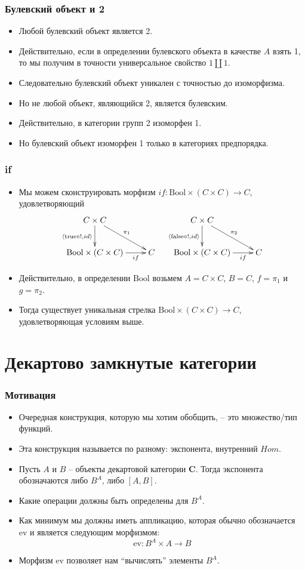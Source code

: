 \documentclass{beamer}
\theoremstyle{definition}
\newcommand{\cat}[1]{\mathbf{#1}}
\renewcommand{\C}{\cat{C}}
\newcommand{\bool}{\mathrm{Bool}}
\newcommand{\true}{\mathrm{true}}
\newcommand{\false}{\mathrm{false}}
\newcommand{\ev}{\mathrm{ev}}
\begin{document}
\begin{frame}
\frametitle{Булевский объект и 2}
\begin{itemize}
\item Любой булевский объект является 2.
\item Действительно, если в определении булевского объекта в качестве $A$ взять 1, то мы получим в точности универсальное свойство $1 \amalg 1$.
\item Следовательно булевский объект уникален с точностью до изоморфизма.
\item Но не любой объект, являющийся 2, является булевским.
\item Действительно, в категории групп 2 изоморфен 1.
\item Но булевский объект изоморфен 1 только в категориях предпорядка.
\end{itemize}
\end{frame}

\begin{frame}
\frametitle{if}
\begin{itemize}
\item Мы можем сконструировать морфизм $if : \bool \times (C \times C) \to C$, удовлетворяющий
\[ \xymatrix{ C \times C \ar[d]_{\langle \true \circ !, id \rangle} \ar[rd]^{\pi_1} \\
              \bool \times (C \times C) \ar[r]_-{if} & C
            }
\quad \xymatrix{ C \times C \ar[d]_{\langle \false \circ !, id \rangle} \ar[rd]^{\pi_2} \\
              \bool \times (C \times C) \ar[r]_-{if} & C
            } \]
\item Действительно, в определении $\bool$ возьмем $A = C \times C$, $B = C$, $f = \pi_1$ и $g = \pi_2$.
\item Тогда существует уникальная стрелка $\bool \times (C \times C) \to C$, удовлетворяющая условиям выше.
\end{itemize}
\end{frame}

\section{Декартово замкнутые категории}

\begin{frame}
\frametitle{Мотивация}
\begin{itemize}
\item Очередная конструкция, которую мы хотим обобщить, -- это множество/тип функций.
\item Эта конструкция называется по разному: экспонента, внутренний $Hom$.
\item Пусть $A$ и $B$ -- объекты декартовой категории $\C$. Тогда экспонента обозначаются либо $B^A$, либо $[A,B]$.
\item Какие операции должны быть определены для $B^A$.
\item Как минимум мы должны иметь аппликацию, которая обычно обозначается $\ev$ и является следующим морфизмом:
\[ \ev : B^A \times A \to B \]
\item Морфизм $\ev$ позволяет нам ``вычислять'' элементы $B^A$.
\end{itemize}
\end{frame}
\end{document}
